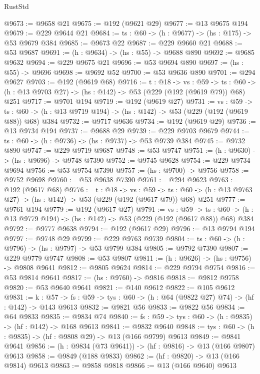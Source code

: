 \begin{lexlean}{RustStd}
\begin{coremodule}
@9673 := @9658 @21
@9675 := @192 (@9621 @29)
@9677 := @13 @9675 @194
@9679 := @229 @9644 @21
@9684 := {ts : @60} -> (h : @9677) -> (hs : @175) -> @53 @9679 @384
@9685 := @9673 @22
@9687 := @229 @9660 @21
@9688 := @53 @9687
@9691 := (h : @9634) -> (hs : @55) -> @9688 @890
@9692 := @9685 @9632
@9694 := @229 @9675 @21
@9696 := @53 @9694 @890
@9697 := (hs : @55) -> @9696
@9698 := @9692 @52
@9700 := @53 @9636 @890
@9701 := @294 @9627
@9703 := @192 (@9619 @68)
@9716 := {t : @18} ->
  {vs : @59} ->
  {ts : @60} -> (h : @13 @9703 @27) -> (hs : @142) -> @53 (@229 (@192 (@9619 @79)) @68) @251
@9717 := @9701 @194
@9719 := @192 (@9619 @27)
@9731 := {vs : @59} ->
  {ts : @60} -> (h : @13 @9719 @194) -> (hs : @142) -> @53 (@229 (@192 (@9619 @88)) @68) @384
@9732 := @9717 @9636
@9734 := @192 (@9619 @29)
@9736 := @13 @9734 @194
@9737 := @9688 @29
@9739 := @229 @9703 @9679
@9744 := {ts : @60} -> (h : @9736) -> (hs : @9737) -> @53 @9739 @384
@9745 := @9732 @890
@9747 := @229 @9719 @9687
@9748 := @53 @9747
@9751 := (h : @9630) -> (hs : @9696) -> @9748 @7390
@9752 := @9745 @9628
@9754 := @229 @9734 @9694
@9756 := @53 @9754 @7390
@9757 := (hs : @9700) -> @9756
@9758 := @9752 @9698
@9760 := @53 @9638 @7390
@9761 := @294 @9623
@9763 := @192 (@9617 @68)
@9776 := {t : @18} ->
  {vs : @59} ->
  {ts : @60} -> (h : @13 @9763 @27) -> (hs : @142) -> @53 (@229 (@192 (@9617 @79)) @68) @251
@9777 := @9761 @194
@9779 := @192 (@9617 @27)
@9791 := {vs : @59} ->
  {ts : @60} -> (h : @13 @9779 @194) -> (hs : @142) -> @53 (@229 (@192 (@9617 @88)) @68) @384
@9792 := @9777 @9638
@9794 := @192 (@9617 @29)
@9796 := @13 @9794 @194
@9797 := @9748 @29
@9799 := @229 @9763 @9739
@9804 := {ts : @60} -> (h : @9796) -> (hs : @9797) -> @53 @9799 @384
@9805 := @9792 @7390
@9807 := @229 @9779 @9747
@9808 := @53 @9807
@9811 := (h : @9626) -> (hs : @9756) -> @9808 @9641
@9812 := @9805 @9624
@9814 := @229 @9794 @9754
@9816 := @53 @9814 @9641
@9817 := (hs : @9760) -> @9816
@9818 := @9812 @9758
@9820 := @53 @9640 @9641
@9821 := @140 @9612
@9822 := @105 @9612
@9831 := {k : @57} ->
  {fs : @59} -> {tys : @60} -> (h : @64 (@9822 @27) @74) -> (hf : @142) -> @143 @9613
@9832 := @9821 @56
@9833 := @9822 @56
@9834 := @64 @9833
@9835 := @9834 @74
@9840 := {fs : @59} -> {tys : @60} -> (h : @9835) -> (hf : @142) -> @168 @9613
@9841 := @9832 @9640
@9848 := {tys : @60} -> (h : @9835) -> (hf : @9808 @29) -> @13 (@166 @9799) @9613
@9849 := @9841 @9641
@9856 := (h : @9834 (@73 @9641)) -> (hf : @9816) -> @13 (@166 @9807) @9613
@9858 := @9849 (@188 @9833)
@9862 := (hf : @9820) -> @13 (@166 @9814) @9613
@9863 := @9858 @9818
@9866 := @13 (@166 @9640) @9613

\end{coremodule}
\end{lexlean}

